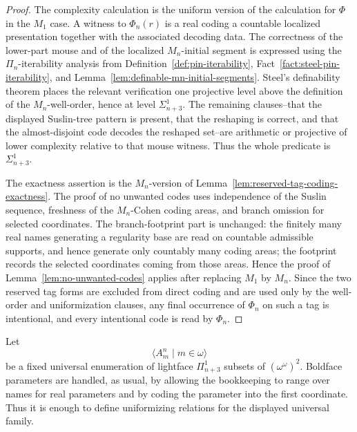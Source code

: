 \documentclass[a4paper,11pt]{article}
\begin{document}
\begin{proof}
The complexity calculation is the uniform version of the calculation for $\Phi$ in the $M_1$ case.  A witness to $\Phi_n(r)$ is a real coding a countable localized presentation together with the associated decoding data.  The correctness of the lower-part mouse and of the localized $M_n$-initial segment is expressed using the $\Pi_n$-iterability analysis from Definition~\ref{def:pin-iterability}, Fact~\ref{fact:steel-pin-iterability}, and Lemma~\ref{lem:definable-mn-initial-segments}.  Steel's definability theorem places the relevant verification one projective level above the definition of the $M_n$-well-order, hence at level $\Sigma^1_{n+3}$.  The remaining clauses--that the displayed Suslin-tree pattern is present, that the reshaping is correct, and that the almost-disjoint code decodes the reshaped set--are arithmetic or projective of lower complexity relative to that mouse witness.  Thus the whole predicate is $\Sigma^1_{n+3}$.

The exactness assertion is the $M_n$-version of Lemma~\ref{lem:reserved-tag-coding-exactness}.  The proof of no unwanted codes uses independence of the Suslin sequence, freshness of the $M_n$-Cohen coding areas, and branch omission for selected coordinates.  The branch-footprint part is unchanged: the finitely many real names generating a regularity base are read on countable admissible supports, and hence generate only countably many coding areas; the footprint records the selected coordinates coming from those areas.  Hence the proof of Lemma~\ref{lem:no-unwanted-codes} applies after replacing $M_1$ by $M_n$.  Since the two reserved tag forms are excluded from direct coding and are used only by the well-order and uniformization clauses, any final occurrence of $\Phi_n$ on such a tag is intentional, and every intentional code is read by $\Phi_n$.
\end{proof}

Let
\[
   \langle A^n_m\mid m\in\omega\rangle
\]
be a fixed universal enumeration of lightface $\Pi^1_{n+3}$ subsets of $(\omega^\omega)^2$.  Boldface parameters are handled, as usual, by allowing the bookkeeping to range over names for real parameters and by coding the parameter into the first coordinate.  Thus it is enough to define uniformizing relations for the displayed universal family.
\end{document}
